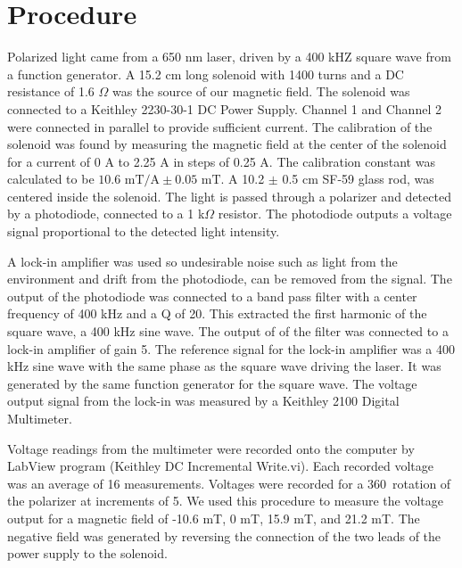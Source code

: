 \documentclass[prb,preprint]{revtex4-1}
\begin{document}
\section{Procedure}
{Polarized light came from a 650 nm laser, driven by a 400 kHZ square wave from a function generator. A 15.2 cm long solenoid with 1400 turns and a DC resistance of 1.6 $\Omega$ was the source of our magnetic field. The solenoid was connected to a Keithley 2230-30-1 DC Power Supply. Channel 1 and Channel 2 were connected in parallel to provide sufficient current. The calibration of the solenoid was found by measuring the magnetic field at the center of the solenoid for a current of 0 A to 2.25 A in steps of 0.25 A. The calibration constant was calculated to be $10.6 \textrm{~mT/A} \pm 0.05 \text{~mT}$. A 10.2 $\pm$ 0.5 cm SF-59 glass rod, was centered inside the solenoid. The light is passed through a polarizer and detected by a photodiode, connected to a 1 k$\Omega$ resistor. The photodiode outputs a voltage signal proportional to the detected light intensity.

A lock-in amplifier was used so undesirable noise such as light from the environment and drift from the photodiode, can be removed from the signal. The output of the photodiode was connected to a band pass filter with a center frequency of 400 kHz and a Q of 20. This extracted the first harmonic of the square wave, a 400 kHz sine wave. The output of of the filter was connected to a lock-in amplifier of gain 5. The reference signal for the lock-in amplifier was a 400 kHz sine wave with the same phase as the square wave driving the laser. It was generated by the same function generator for the square wave. The voltage output signal from the lock-in was measured by a Keithley 2100 Digital Multimeter.

Voltage readings from the multimeter were recorded onto the computer by LabView program (Keithley DC Incremental Write.vi). Each recorded voltage was an average of 16 measurements. Voltages were recorded for a 360\degree\ rotation of the polarizer at increments of 5\degree. We used this procedure to measure the voltage output for a magnetic field of -10.6 mT, 0 mT, 15.9 mT, and 21.2 mT. The negative field was generated by reversing the connection of the two leads of the power supply to the solenoid.
}
\end{document}
